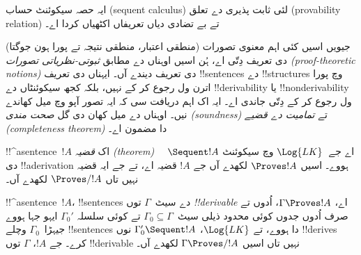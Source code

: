\documentclass[../../../include/open-logic-section]{subfiles}
\begin{document}
\begin{editorial}
  ایہ حصہ سیکوئنٹ حساب (sequent calculus) لئی ثابت پذیری دے تعلق
  (provability relation) تے بے تضادی دیاں تعریفاں اکٹھیاں کردا اے۔
\end{editorial}

      {}
      {}


\begin{explain}
جیویں اسیں کئی اہم معنوی تصورات (منطقی اعتبار، منطقی نتیجہ تے پورا ہون
جوگتا) دی تعریف دِتّی اے، ہُن اسیں اوہناں دے مطابق
\emph{ثبوتی-نظریاتی تصورات (proof-theoretic notions)} دی تعریف دیندے آں۔
ایہناں دی تعریف !!{sentence}s دے !!{structure}s وچ پورا اترن ول رجوع کر کے
نہیں، بلکہ کجھ سیکوئنٹاں دے !!{derivability} یا !!{nonderivability} ول رجوع
کر کے دِتّی جاندی اے۔ ایہ اک اہم دریافت سی کہ ایہ تصور آپو وچ میل کھاندے
نیں۔ اوہناں دے میل کھان دی گل \emph{صحت مندی (soundness)} تے
\emph{تمامیت دے قضیے (completeness theorem)} دا مضمون اے۔
\end{explain}

\begin{defn}
!!^a{sentence}~$!A$ اک \emph{قضیہ (theorem)} اے جے~$\Log{LK}$ وچ
سیکوئنٹ $\quad \Sequent !A$ دی !!a{derivation} ہووے۔ اسیں $\Proves !A$
لکھدے آں جے $!A$ قضیہ اے، تے جے ایہ قضیہ نہیں تاں
$\Proves/ !A$ لکھدے آں۔
\end{defn}

\begin{defn}[!!^{derivability}]
!!^a{sentence}~$!A$، !!{sentence}s دے سیٹ~$\Gamma$ توں
\emph{!!{derivable}} اے، $\Gamma \Proves !A$، اُدوں تے صرف اُدوں جدوں
کوئی محدود ذیلی سیٹ~$\Gamma_0 \subseteq \Gamma$ تے کوئی سلسلہ
$\Gamma_0'$ ایہو جہا ہووے جیہڑا~$\Gamma_0$ وچلے !!{sentence}s دا ہووے،
تے $\Log{LK}$، $\Gamma_0' \Sequent !A$ نوں !!{derive}s کرے۔ جے $!A$، $\Gamma$ توں
!!{derivable} نہیں تاں اسیں $\Gamma \Proves/ !A$ لکھدے آں۔
\end{defn}
\end{document}
